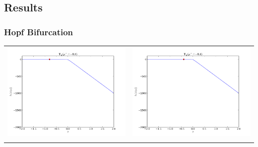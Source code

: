 \documentclass[12pt,a4paper,titlepage]{article}
\begin{document}
\subsection{Results}
\subsubsection{Hopf Bifurcation}
\begin{table}[ht]
\centering
\begin{tabular}{cc}
\includegraphics[scale=0.3]{likelihood_hopf08m}&\includegraphics[scale=0.3]{likelihood_hopf04m}\\
\newline

\end{tabular}
\end{table}
\end{document}
